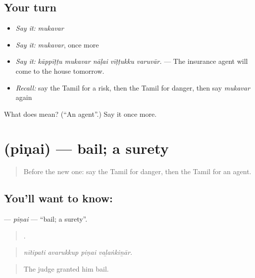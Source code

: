 \subsection*{Your turn}
\begin{itemize}
\raggedright
  \item \emph{Say it:} \emph{mukavar}
  \item \emph{Say it:} \emph{mukavar}, once more
  \item \emph{Say it:} \emph{kāppīṭṭu mukavar nāḷai vīṭṭukku varuvār.} — The insurance agent will come to the house tomorrow.
  \item \emph{Recall:} say the Tamil for a risk, then the Tamil for danger, then say \emph{mukavar} again
\end{itemize}

\begin{tcolorbox}[breakable,colback=teal!4,colframe=teal!35!black,title={Before you move on}]
What does  mean? (\textquotedblleft{}An agent\textquotedblright{}.) Say it once more.
\end{tcolorbox}
\section[\texorpdfstring{\ta{பிணை} (piṇai)}{பிணை (piṇai)}]{ (piṇai) — bail; a surety}

\label{lesson:TA-C541-pinai}



\begin{quote}
Before the new one: say the Tamil for danger, then the Tamil for an agent.
\end{quote}

\subsection*{You'll want to know: }
\textbf{} — \emph{piṇai} — \textquotedblleft{}bail; a surety\textquotedblright{}.

\begin{quote}
   .
\end{quote}

\begin{quote}
\emph{nītipati avarukkup piṇai vaḻaṅkiṉār.}
\end{quote}

\begin{quote}
The judge granted him bail.
\end{quote}

